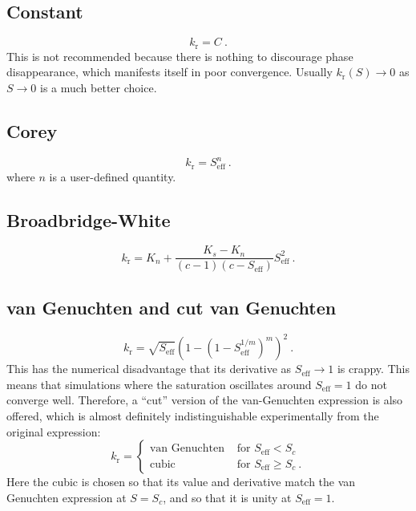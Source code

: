 \documentclass[12pt]{report}
\begin{document}
\subsection{Constant}

\begin{equation}
k_{\mathrm{r}} = C \ .
\end{equation}
This is not recommended because there is nothing to discourage phase
disappearance, which manifests itself in poor convergence.  Usually
$k_{\mathrm{r}}(S) \rightarrow 0$ as $S\rightarrow 0$ is a much better
choice.

\subsection{Corey}

\begin{equation}
k_{\mathrm{r}} = S_{\mathrm{eff}}^{n} \ .
\end{equation}
where $n$ is a user-defined quantity.

\subsection{Broadbridge-White}

\begin{equation}
k_{\mathrm{r}} = K_{n} + \frac{K_{s} - K_{n}}{(c - 1)(c -
  S_{\mathrm{eff}})}S_{\mathrm{eff}}^{2} \ .
\end{equation}

\subsection{van Genuchten and cut van Genuchten}

\begin{equation}
k_{\mathrm{r}} = \sqrt{S_{\mathrm{eff}}} \left(1 - (1 -
S_{\mathrm{eff}}^{1/m})^{m} \right)^{2} \ .
\end{equation}
This has the numerical disadvantage that its derivative as
$S_{\mathrm{eff}}\rightarrow 1$ is crappy.  This means that
simulations where the saturation oscillates around
$S_{\mathrm{eff}}=1$ do not converge well.  Therefore, a ``cut''
version of the van-Genuchten expression is also offered, which is
almost definitely indistinguishable experimentally from the original
expression:
\begin{equation}
k_{\mathrm{r}} = \left\{
\begin{array}{ll}
\mbox{van Genuchten} & \mbox{ for } S_{\mathrm{eff}} < S_{c} \\
\mbox{cubic} & \mbox{ for } S_{\mathrm{eff}} \geq S_{c} \ .
\end{array}
\right.
\end{equation}
Here the cubic is chosen so that its value and derivative match the
van Genuchten expression at $S=S_{c}$, and so that it is unity at
$S_{\mathrm{eff}}=1$.
\end{document}
